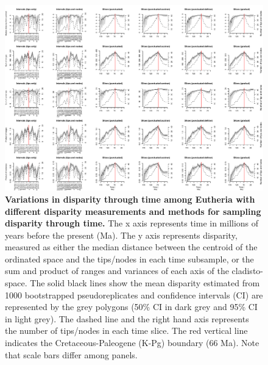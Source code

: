 \begin{landscape}
\begin{figure}[!htbp]
\centering
    \includegraphics[width=\textwidth,height=\textheight,keepaspectratio]{Supplementaries/Figures/STD/Eutheria_all_methods.pdf}
\caption[Comparison of all the disparity metrics and all the time sampling methods for Eutheria]{\textbf{Variations in disparity through time among Eutheria with different disparity measurements and methods for sampling disparity through time.} The x axis represents time in millions of years before the present (Ma). The y axis represents disparity, measured as either the median distance between the centroid of the ordinated space and the tips/nodes in each time subsample, or the sum and product of ranges and variances of each axis of the cladisto-space. The solid black lines show the mean disparity estimated from 1000 bootstrapped pseudoreplicates and confidence intervals (CI) are represented by the grey polygons (50\% CI in dark grey and 95\% CI in light grey). The dashed line and the right hand axis represents the number of tips/nodes in each time slice. The red vertical line indicates the Cretaceous-Paleogene (K-Pg) boundary (66 Ma). Note that scale bars differ among panels.}
\label{Supp_disparity_all_Eutheria}
\end{figure}
\end{landscape}

